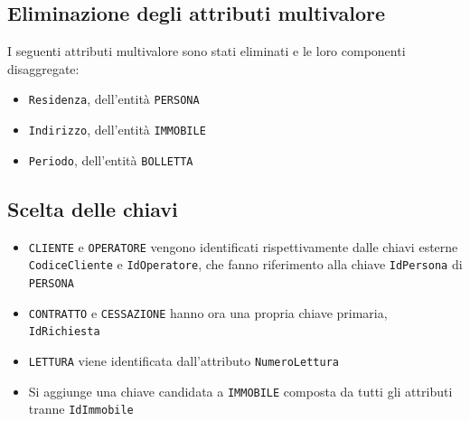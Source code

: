 \documentclass[a4paper,12pt]{report}
\begin{document}
\subsection{Eliminazione degli attributi multivalore}
I seguenti attributi multivalore sono stati eliminati e le loro componenti disaggregate:
\begin{itemize}
    \item \texttt{Residenza}, dell'entità \texttt{PERSONA}
    \item \texttt{Indirizzo}, dell'entità \texttt{IMMOBILE}
    \item \texttt{Periodo}, dell'entità \texttt{BOLLETTA}
\end{itemize}

\subsection{Scelta delle chiavi}
\begin{itemize}
    \item \texttt{CLIENTE} e \texttt{OPERATORE} vengono identificati rispettivamente dalle chiavi esterne \texttt{CodiceCliente} e \texttt{IdOperatore}, che fanno riferimento alla chiave \texttt{IdPersona} di \texttt{PERSONA}
    \item \texttt{CONTRATTO} e \texttt{CESSAZIONE} hanno ora una propria chiave primaria, \texttt{IdRichiesta}
    \item \texttt{LETTURA} viene identificata dall'attributo \texttt{NumeroLettura}
    \item Si aggiunge una chiave candidata a \texttt{IMMOBILE} composta da tutti gli attributi tranne \texttt{IdImmobile}
\end{itemize}
\end{document}
